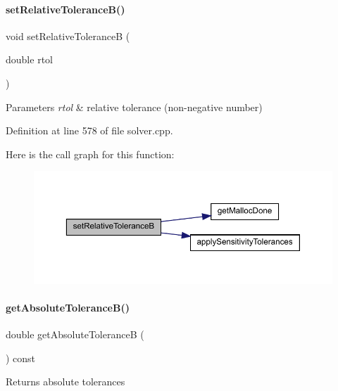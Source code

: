 \paragraph{\texorpdfstring{setRelativeToleranceB()}{setRelativeToleranceB()}}
{\footnotesize\ttfamily void set\+Relative\+ToleranceB (\begin{DoxyParamCaption}\item[{double}]{rtol }\end{DoxyParamCaption})}


\begin{DoxyParams}{Parameters}
{\em rtol} & relative tolerance (non-\/negative number) \\
\hline
\end{DoxyParams}


Definition at line 578 of file solver.\+cpp.

Here is the call graph for this function\+:
\nopagebreak
\begin{figure}[H]
\begin{center}
\leavevmode
\includegraphics[width=350pt]{classamici_1_1_solver_a63eaa8593d16c31cedbbd038925eff2d_cgraph}
\end{center}
\end{figure}
\mbox{\label{classamici_1_1_solver_ac495bd9ff960704197bc5e48ef9ee5de}} 
\paragraph{\texorpdfstring{getAbsoluteToleranceB()}{getAbsoluteToleranceB()}}
{\footnotesize\ttfamily double get\+Absolute\+ToleranceB (\begin{DoxyParamCaption}{ }\end{DoxyParamCaption}) const}

\begin{DoxyReturn}{Returns}
absolute tolerances 
\end{DoxyReturn}



